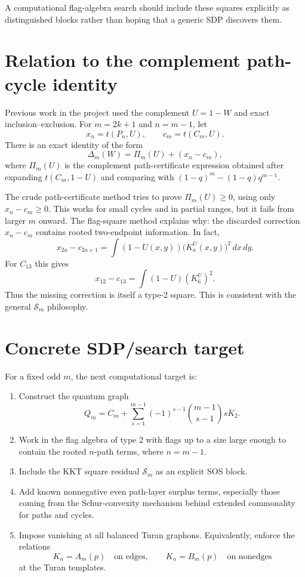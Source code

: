 \documentclass[11pt]{article}
\theoremstyle{definition}
\newcommand{\dd}{\,d}
\begin{document}
A computational flag-algebra search should include these squares explicitly as distinguished blocks rather than hoping that a generic SDP discovers them.

\section{Relation to the complement path-cycle identity}

Previous work in the project used the complement $U=1-W$ and exact inclusion--exclusion.  For $m=2k+1$ and $n=m-1$, let
\[
        x_n=t(P_n,U),
        \qquad
        c_m=t(C_m,U).
\]
There is an exact identity of the form
\[
        \Delta_m(W)=\Pi_m(U)+(x_n-c_m),
\]
where $\Pi_m(U)$ is the complement path-certificate expression obtained after expanding $t(C_m,1-U)$ and comparing with $(1-q)^m-(1-q)q^{m-1}$.

The crude path-certificate method tries to prove $\Pi_m(U)\ge0$, using only $x_n-c_m\ge0$.  This works for small cycles and in partial ranges, but it fails from larger $m$ onward.  The flag-square method explains why: the discarded correction $x_n-c_m$ contains rooted two-endpoint information.  In fact,
\[
        x_{2a}-c_{2a+1}=\int (1-U(x,y))\bigl(K_a^U(x,y)\bigr)^2\dd x\dd y.
\]
For $C_{13}$ this gives
\[
        x_{12}-c_{13}=\int(1-U)(K_6^U)^2.
\]
Thus the missing correction is itself a type-2 square.  This is consistent with the general $\mathcal S_m$ philosophy.

\section{Concrete SDP/search target}

For a fixed odd $m$, the next computational target is:
\begin{enumerate}[leftmargin=2em]
        \item Construct the quantum graph
        \[
                Q_m=C_m+
                \sum_{s=1}^{m-1}(-1)^{s-1}\binom{m-1}{s-1}sK_2.
        \]
        \item Work in the flag algebra of type $2$ with flags up to a size large enough to contain the rooted $n$-path terms, where $n=m-1$.
        \item Include the KKT square residual $\mathcal S_m$ as an explicit SOS block.
        \item Add known nonnegative even path-layer surplus terms, especially those coming from the Schur-convexity mechanism behind extended commonality for paths and cycles.
        \item Impose vanishing at all balanced Turan graphons.  Equivalently, enforce the relations
        \[
                K_n=A_m(p)\quad\text{on edges},
                \qquad
                K_n=B_m(p)\quad\text{on nonedges}
        \]
        at the Turan templates.
\end{enumerate}
\end{document}
